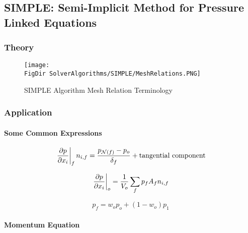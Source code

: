 \subsection{SIMPLE: Semi-Implicit Method for Pressure Linked Equations}


\FloatBarrier
\subsubsection{Theory}

\begin{figure}
\centering
\texttt{[image: \\FigDir SolverAlgorithms/SIMPLE/MeshRelations.PNG]}
\caption{\label{fig:MeshRelations}SIMPLE Algorithm Mesh Relation Terminology}
\end{figure}


\FloatBarrier
\subsubsection{Application}

\paragraph{Some Common Expressions}

\begin{equation}
\left.\pdv{p}{x_i}\right|_f n_{i,f} =  \frac{p_{\mathcal{N}(f)} - p_o}{\delta_f} + \text{tangential component}
\end{equation}

\begin{equation}
\left.\pdv{p}{x_i}\right|_o = \frac{1}{V_o} \sum_{f} p_f A_f n_{i,f}
\end{equation}

\begin{equation}
p_f = w_o p_o + (1-w_o) p_1
\end{equation}



\paragraph{Momentum Equation}

